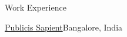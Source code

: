 \documentclass{resume} %
\begin{document}
\begin{rSection}{Work Experience}
\begin{rSubsection}{\href{https://www.publicissapient.com/}{Publicis Sapient}}{Bangalore, India}{}{}


\end{rSubsection}
\end{rSection}
\end{document}
